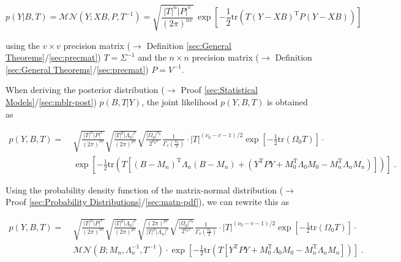 \documentclass[a4paper,12pt,twoside]{book}
\begin{document}
\begin{equation} \label{eq:mblr-lme-GLM-LF-Bayes}
p(Y|B,T) = \mathcal{MN}(Y; X B, P, T^{-1}) = \sqrt{\frac{|T|^n |P|^v}{(2 \pi)^{nv}}} \, \exp\left[ -\frac{1}{2} \mathrm{tr}\left( T (Y-XB)^\mathrm{T} P (Y-XB) \right) \right]
\end{equation}

using the $v \times v$ precision matrix ($\rightarrow$ Definition \ref{sec:General Theorems}/\ref{sec:precmat}) $T = \Sigma^{-1}$ and the $n \times n$ precision matrix ($\rightarrow$ Definition \ref{sec:General Theorems}/\ref{sec:precmat}) $P = V^{-1}$.

\vspace{1em}
When deriving the posterior distribution ($\rightarrow$ Proof \ref{sec:Statistical Models}/\ref{sec:mblr-post}) $p(B,T|Y)$, the joint likelihood $p(Y,B,T)$ is obtained as

\begin{equation} \label{eq:mblr-lme-GLM-NW-LME-s1}
\begin{split}
p(Y,B,T) = \; & \sqrt{\frac{|T|^n |P|^v}{(2 \pi)^{nv}}} \sqrt{\frac{|T|^p |\Lambda_0|^v}{(2 \pi)^{pv}}} \sqrt{\frac{|\Omega_0|^{\nu_0}}{2^{\nu_0 v}}} \frac{1}{\Gamma_v \left( \frac{\nu_0}{2} \right)} \cdot |T|^{(\nu_0-v-1)/2} \exp\left[ -\frac{1}{2} \mathrm{tr}\left( \Omega_0 T \right) \right] \cdot \\
& \exp\left[ -\frac{1}{2} \mathrm{tr}\left( T \left[ (B-M_n)^\mathrm{T} \Lambda_n (B-M_n) + (Y^\mathrm{T} P Y + M_0^\mathrm{T} \Lambda_0 M_0 - M_n^\mathrm{T} \Lambda_n M_n) \right] \right) \right] \; .
\end{split}
\end{equation}

Using the probability density function of the matrix-normal distribution ($\rightarrow$ Proof \ref{sec:Probability Distributions}/\ref{sec:matn-pdf}), we can rewrite this as

\begin{equation} \label{eq:mblr-lme-GLM-NW-LME-s2}
\begin{split}
p(Y,B,T) = \; & \sqrt{\frac{|T|^n |P|^v}{(2 \pi)^{nv}}} \sqrt{\frac{|T|^p |\Lambda_0|^v}{(2 \pi)^{pv}}} \sqrt{\frac{(2 \pi)^{pv}}{|T|^p |\Lambda_n|^v}} \sqrt{\frac{|\Omega_0|^{\nu_0}}{2^{\nu_0 v}}} \frac{1}{\Gamma_v \left( \frac{\nu_0}{2} \right)} \cdot |T|^{(\nu_0-v-1)/2} \exp\left[ -\frac{1}{2} \mathrm{tr}\left( \Omega_0 T \right) \right] \cdot \\
& \mathcal{MN}(B; M_n, \Lambda_n^{-1}, T^{-1}) \cdot \exp\left[ -\frac{1}{2} \mathrm{tr}\left( T \left[ Y^\mathrm{T} P Y + M_0^\mathrm{T} \Lambda_0 M_0 - M_n^\mathrm{T} \Lambda_n M_n \right] \right) \right] \; .
\end{split}
\end{equation}
\end{document}
